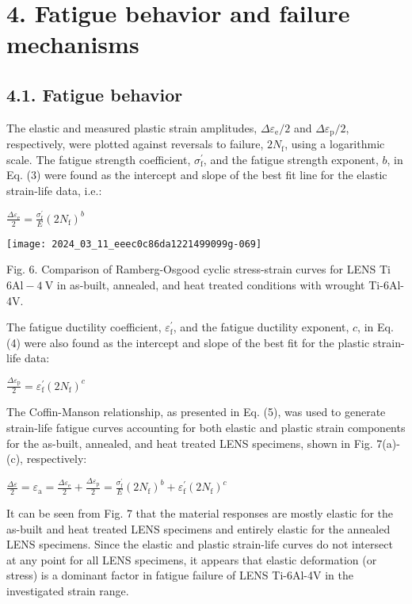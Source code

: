 \documentclass[10pt]{article}
\begin{document}
\section*{4. Fatigue behavior and failure mechanisms}
\subsection*{4.1. Fatigue behavior}
The elastic and measured plastic strain amplitudes, $\Delta \varepsilon_{\mathrm{e}} / 2$ and $\Delta \varepsilon_{\mathrm{p}} / 2$, respectively, were plotted against reversals to failure, $2 N_{\mathrm{f}}$, using a logarithmic scale. The fatigue strength coefficient, $\sigma_{\mathrm{f}}^{\prime}$, and the fatigue strength exponent, $b$, in Eq. (3) were found as the intercept and slope of the best fit line for the elastic strain-life data, i.e.:

$\frac{\Delta \varepsilon_{\mathrm{e}}}{2}=\frac{\sigma_{\mathrm{f}}^{\prime}}{E}\left(2 N_{\mathrm{f}}\right)^{b}$

\begin{center}
\texttt{[image: 2024\_03\_11\_eeec0c86da1221499099g-069]}
\end{center}

Fig. 6. Comparison of Ramberg-Osgood cyclic stress-strain curves for LENS Ti$6 \mathrm{Al}-4 \mathrm{~V}$ in as-built, annealed, and heat treated conditions with wrought Ti-6Al-4V.

The fatigue ductility coefficient, $\varepsilon_{\mathrm{f}}^{\prime}$, and the fatigue ductility exponent, $c$, in Eq. (4) were also found as the intercept and slope of the best fit for the plastic strain-life data:

$\frac{\Delta \varepsilon_{\mathrm{p}}}{2}=\varepsilon_{\mathrm{f}}^{\prime}\left(2 N_{\mathrm{f}}\right)^{c}$

The Coffin-Manson relationship, as presented in Eq. (5), was used to generate strain-life fatigue curves accounting for both elastic and plastic strain components for the as-built, annealed, and heat treated LENS specimens, shown in Fig. 7(a)-(c), respectively:

$\frac{\Delta \varepsilon}{2}=\varepsilon_{\mathrm{a}}=\frac{\Delta \varepsilon_{\mathrm{e}}}{2}+\frac{\Delta \varepsilon_{\mathrm{p}}}{2}=\frac{\sigma_{\mathrm{f}}^{\prime}}{E}\left(2 N_{\mathrm{f}}\right)^{b}+\varepsilon_{\mathrm{f}}^{\prime}\left(2 N_{\mathrm{f}}\right)^{c}$

It can be seen from Fig. 7 that the material responses are mostly elastic for the as-built and heat treated LENS specimens and entirely elastic for the annealed LENS specimens. Since the elastic and plastic strain-life curves do not intersect at any point for all LENS specimens, it appears that elastic deformation (or stress) is a dominant factor in fatigue failure of LENS Ti-6Al-4V in the investigated strain range.
\end{document}
